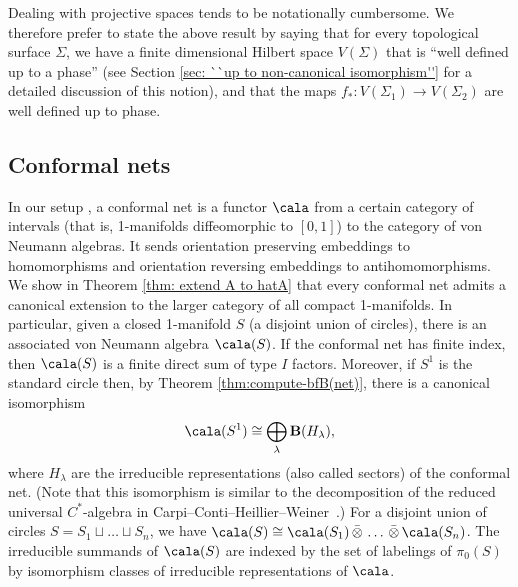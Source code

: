 \documentclass[a4paper,10pt,leqno]{amsart}
\newcommand{\bfB}{{\mathbf B}}   \newcommand{\sfB}{{\mathsf{B}}}
\theoremstyle{plain}
\theoremstyle{definition}
\theoremstyle{remark}
\DeclareRobustCommand{\SkipTocEntry}[5]{}
\begin{document}
Dealing with projective spaces tends to be notationally cumbersome.
We therefore prefer to state the above result by saying that for every topological surface $\Sigma$, we have a finite dimensional Hilbert space $V(\Sigma)$ that is ``well defined up to a phase''
(see Section \ref{sec: ``up to non-canonical isomorphism''} for a detailed discussion of this notion),
and that the maps $f_*:V(\Sigma_1)\to V(\Sigma_2)$ are well defined up to phase.



\subsection*{Conformal nets}
In our setup \cite{BDH(nets)}, a conformal net is a functor $\cala$ from a certain category of intervals (that is, 1-manifolds diffeomorphic to $[0,1]$) to the category of von Neumann algebras.
It sends orientation preserving embeddings to homomorphisms and orientation reversing embeddings to antihomomorphisms. 
We show in Theorem \ref{thm: extend A to hatA} that every conformal net admits a canonical extension to the larger category of all compact 1-manifolds.
In particular, given a closed 1-manifold $S$ (a disjoint union of circles), there is an associated von Neumann algebra $\cala(S)$.
If the conformal net has finite index, then $\cala(S)$ is a finite direct sum of type $I$ factors.
Moreover, if $S^1$ is the standard circle then, by Theorem \ref{thm:compute-bfB(net)}, there is a canonical isomorphism
\begin{equation}\label{eq: algebra A(S)}
\cala(S^1)\cong \bigoplus_\lambda \bfB(H_\lambda),
\end{equation}
where $H_\lambda$ are the irreducible representations (also called sectors) of the conformal net.  (Note that this isomorphism is similar to the decomposition of the reduced universal $C^\ast$-algebra in Carpi--Conti--Heillier--Weiner~\cite{cchw}.) 
For a disjoint union of circles $S=S_1\sqcup \ldots \sqcup S_n$, we have $\cala(S)\cong \cala(S_1)\,\bar\otimes\, \ldots \,\bar\otimes\,\cala(S_n)$.
The irreducible summands of $\cala(S)$ are indexed by the set of labelings of $\pi_0(S)$ by isomorphism classes of irreducible representations of $\cala$.
\end{document}
